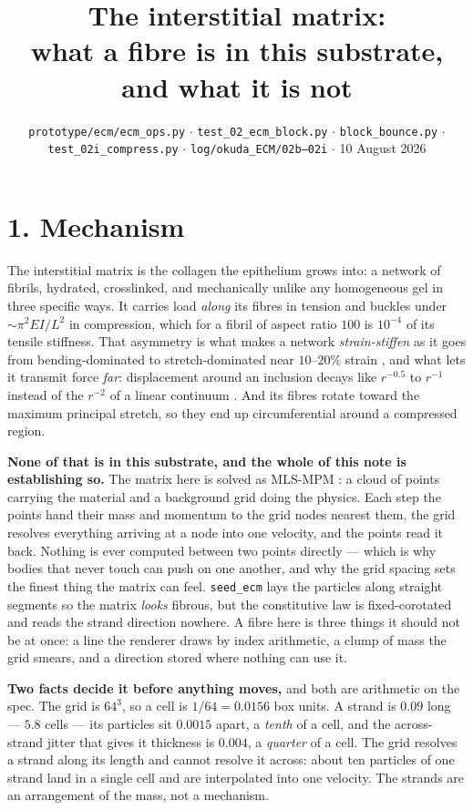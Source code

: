 \documentclass[10pt,a4paper]{article}
\title{\vspace{-1.4cm}\textbf{The interstitial matrix:\\
\normalsize what a fibre is in this substrate, and what it is not}}
\author{}
\date{\vspace{-0.9cm}\small \texttt{prototype/ecm/ecm\_ops.py} $\cdot$
\texttt{test\_02\_ecm\_block.py} $\cdot$ \texttt{block\_bounce.py} $\cdot$
\texttt{test\_02i\_compress.py} $\cdot$
\texttt{log/okuda\_ECM/02b--02i} $\cdot$ 10 August 2026}
\newcommand{\op}[1]{\texttt{#1}}
\begin{document}
\maketitle\vspace{-1.0cm}

\section*{1.\; Mechanism}

The interstitial matrix is the collagen the epithelium grows into: a network of fibrils, hydrated,
crosslinked, and mechanically unlike any homogeneous gel in three specific ways. It carries load
\emph{along} its fibres in tension and buckles under $\sim\!\pi^2EI/L^2$ in compression, which for a
fibril of aspect ratio $100$ is $10^{-4}$ of its tensile stiffness. That asymmetry is what makes a
network \emph{strain-stiffen} as it goes from bending-dominated to stretch-dominated near $10$--$20\%$
strain \cite{storm2005,licup2015}, and what lets it transmit force \emph{far}: displacement around an
inclusion decays like $r^{-0.5}$ to $r^{-1}$ instead of the $r^{-2}$ of a linear continuum
\cite{wang2014}. And its fibres rotate toward the maximum principal stretch, so they end up
circumferential around a compressed region.

\textbf{None of that is in this substrate, and the whole of this note is establishing so.} The matrix
here is solved as MLS-MPM \cite{sulsky1994,hu2018}: a cloud of points carrying the material and a
background grid doing the physics. Each step the points hand their mass and momentum to the grid nodes
nearest them, the grid resolves everything arriving at a node into one velocity, and the points read
it back. Nothing is ever computed between two points directly --- which is why bodies that never touch
can push on one another, and why the grid spacing sets the finest thing the matrix can feel.
\op{seed\_ecm} lays the particles along straight segments so the matrix \emph{looks} fibrous, but the
constitutive law is fixed-corotated and reads the strand direction nowhere. A fibre here is three
things it should not be at once: a line the renderer draws by index arithmetic, a clump of mass the
grid smears, and a direction stored where nothing can use it.

\textbf{Two facts decide it before anything moves,} and both are arithmetic on the spec. The grid is
$64^3$, so a cell is $1/64=0.0156$ box units. A strand is $0.09$ long --- $5.8$ cells --- its particles
sit $0.0015$ apart, a \emph{tenth} of a cell, and the across-strand jitter that gives it thickness is
$0.004$, a \emph{quarter} of a cell. The grid resolves a strand along its length and cannot resolve it
across: about ten particles of one strand land in a single cell and are interpolated into one velocity.
The strands are an arrangement of the mass, not a mechanism.
\end{document}
